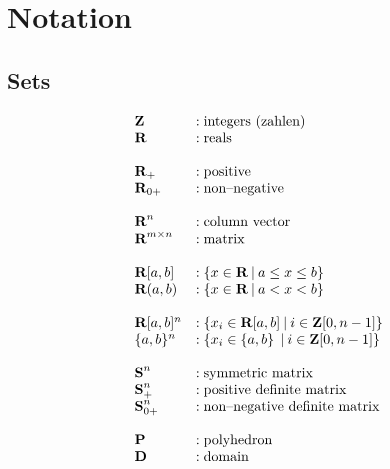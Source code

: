 \documentclass{article}
\title{\QP}
\author {
            Dr. Luke A.~Wendt                                       \\
            Department of Electrical and Computer Engineering       \\
            University of Illinois at Urbana-Champaign              \\
            \texttt{Luke.A.Wendt@gmail.com}                         \\
            \url{Luke-A-Wendt.info}                                 \\
        }
\begin{document}
\maketitle
\begin{abstract}

    This repo explores general formulation 
    of \LP (linear programs)  and \QP (quadratic programs)
    with applications in modeling, prediction, and control.
    These formulations have well-known solution methods that scale and 
    are fully developed technologies integrated into most programming languages
    (making them readily available for embedded applications).
    State-of-the-art implamentation uses hardware accelerated 
    distributed optimization specialized for sparse representations and parallelization.


\end{abstract}
\clearpage
\tableofcontents 
\clearpage
\section{Notation}

\subsection{Sets}
\begin{align*}
    \begin{array}{ll}
        \textbf{Z}&:\text{integers (zahlen)}\\
        \textbf{R}&:\text{reals}\\
        \\
        \textbf{R}_+&: \text{positive}\\
        \textbf{R}_{0+}&: \text{non--negative}\\
        \\
        \textbf{R}^n &:\text{column vector}\\
        \textbf{R}^{m\times n} &:\text{matrix}\\
        \\
        \textbf{R}[a,b] &:\{x\in\textbf{R}\:|\:a\leq x\leq b\}\\
        \textbf{R}(a,b) &:\{x\in\textbf{R}\:|\:a<x<b\}\\
        \\
        \textbf{R}[a,b]^n&: \{x_i\in\textbf{R}[a,b]\:|\:i\in\textbf{Z}[0,n-1]\}\\
        \{a,b\}^n&: \{x_i\in\{a,b\}\:\:|\:i\in\textbf{Z}[0,n-1]\}\\
        \\
        \textbf{S}^n&: \text{symmetric matrix}\\
        \textbf{S}_+^n&: \text{positive definite matrix}\\
        \textbf{S}_{0+}^n&: \text{non--negative definite matrix}\\
        \\
        \textbf{P}&:\text{polyhedron}\\
        \textbf{D}&:\text{domain}
    \end{array}
\end{align*}
\end{document}
